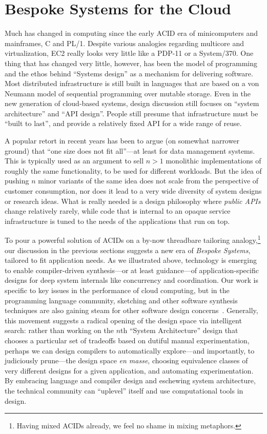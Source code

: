 \documentclass{sig-alternate}
\begin{document}
\section{Bespoke Systems for the Cloud}
Much has changed in computing since the early ACID era of minicomputers and mainframes, C and PL/1.  Despite various analogies regarding multicore and virtualization, EC2 really looks very little like a PDP-11 or a System/370.  One thing that has changed very little, however, has been the model of programming and the ethos behind ``Systems design'' as a mechanism for delivering software.  Most distributed infrastructure is still built in languages that are based on a von Neumann model of sequential programming over mutable storage.  Even in the new generation of cloud-based systems, design discussion still focuses on ``system architecture'' and ``API design''.  People still presume that infrastructure must be ``built to last'', and provide a relatively fixed API for a wide range of reuse.  

A popular retort in recent years has been to argue (on somewhat narrower ground) that ``one size does not fit all''---at least for data management systems.  This is typically used as an argument to sell $n>1$ monolithic implementations of roughly the same functionality, to be used for different workloads.  But the idea of pushing $n$ minor variants of the same idea does not scale from the perspective of customer consumption, nor does it lead to a very wide diversity of system designs or research ideas.  What is really needed is a design philosophy where \emph{public APIs} change relatively rarely, while code that is internal to an opaque service infrastructure is tuned to the needs of the applications that run on top.

To pour a powerful solution of ACIDs on a by-now threadbare tailoring analogy,\footnote{Having mixed ACIDs already, we feel no shame in mixing metaphors.} our discussion in the previous sections suggests a new era of \emph{Bespoke Systems}, tailored to fit application needs.  As we illustrated above, technology is emerging to enable compiler-driven synthesis---or at least guidance---of application-specific designs for deep system internals like concurrency and coordination.  Our work is specific to key issues in the performance of cloud computing, but in the programming language community, sketching and other software synthesis techniques are also gaining steam for other software design concerns~\cite{Kuncak2012}.  Generally, this movement suggests a radical opening of the design space via intelligent search: rather than working on the $n$th ``System Architecture'' design that chooses a particular set of tradeoffs based on dutiful manual experimentation, perhaps we can design compilers to automatically explore---and importantly, to judiciously prune---the design space \emph{en masse}, choosing equivalence classes of very different designs for a given application, and automating experimentation.  By embracing language and compiler design and eschewing system architecture, the technical community can ``uplevel'' itself and use computational tools in design.
\end{document}
